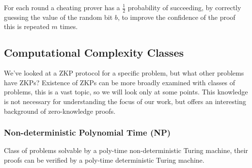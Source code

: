 \noindent For each round a cheating prover has a $\frac{1}{2}$ probability of succeeding, by correctly guessing the value of the random bit $b$, to improve the confidence of the proof this is repeated $m$ times.

%

\subsection{Computational Complexity Classes}
We've looked at a ZKP protocol for a specific problem, but what other problems have ZKPs?
Existence of ZKPs can be more broadly examined with classes of problems, this is a vast topic, so we will look only at some points. 
This knowledge is not necessary for understanding the focus of our work, but offers an interesting background of zero-knowledge proofs.

\subsubsection{Non-deterministic Polynomial Time (NP)}


Class of problems solvable by a poly-time non-deterministic Turing machine, their proofs can be verified by a poly-time deterministic Turing machine.

